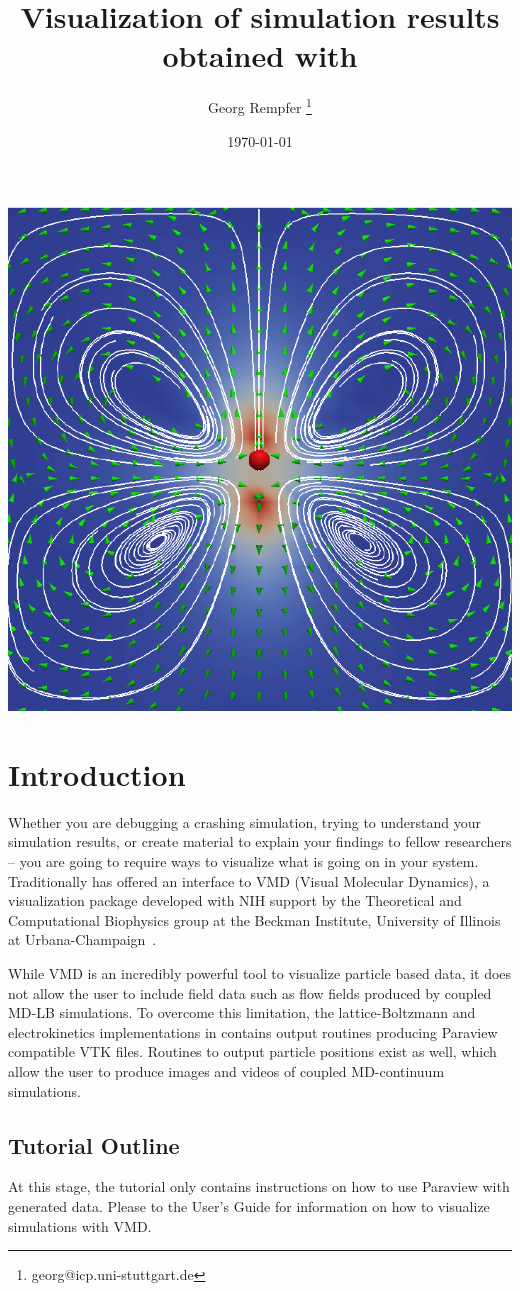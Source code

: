 \renewcommand{\d}{\mathrm d}
\subject{ESPResSo Tutorial}
\title{Visualization of simulation results obtained with \ES{}
} \author{ Georg Rempfer \thanks{\ttfamily 
georg@icp.uni-stuttgart.de}}
\date{\today}
\publishers{Institute for Computational Physics, University of Stuttgart}
\maketitle 
\begin{center}
  \includegraphics[width=0.5\columnwidth]{figures/flow_field.pdf}
\end{center}
\pagebreak
{}

 \tableofcontents
 \pagebreak
  
\section{Introduction}


Whether you are debugging a crashing simulation, trying to understand your simulation results, or create material to explain your findings to fellow researchers -- you are going to require ways to visualize what is going on in your system. Traditionally \ES{} has offered an interface to VMD (Visual Molecular Dynamics), a visualization package developed with NIH support by the Theoretical and Computational Biophysics group at the Beckman Institute, University of Illinois at Urbana-Champaign~\cite{vmd}.

While VMD is an incredibly powerful tool to visualize particle based data, it does not allow the user to include field data such as flow fields produced by coupled MD-LB simulations. To overcome this limitation, the lattice-Boltzmann and electrokinetics implementations in \ES{} contains output routines producing Paraview compatible VTK files. Routines to output particle positions exist as well, which allow the user to produce images and videos of coupled MD-continuum simulations.

\subsection*{Tutorial Outline}

At this stage, the tutorial only contains instructions on how to use Paraview with \ES{} generated data. Please to the User's Guide for information on how to visualize \ES{} simulations with VMD.

\pagebreak
